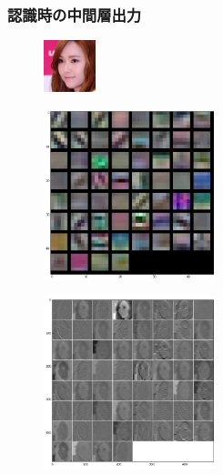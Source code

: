 \documentclass[dvipdfmx,11pt,notheorems]{beamer}
\theoremstyle{definition}
\begin{document}
\begin{frame}\frametitle{認識時の中間層出力}
\begin{figure}[t]
  \centering
  \includegraphics[clip,width=1.5cm, bb = 0 0 128 128]{./fig/png/jessica_0010.jpg}
\end{figure}
\begin{figure}[t]
 \begin{minipage}{0.45\hsize}
  \centering
  \includegraphics[width=50mm, bb = 0 0 588 586]{./fig/png/snsd_filter.png} \\
 \end{minipage}
 \begin{minipage}{0.45\hsize}
  \centering
  \includegraphics[width=50mm, bb = 0 0 594 590]{./fig/png/snsd_output.png}\\
 \end{minipage}
\end{figure}
\end{frame}
\end{document}
